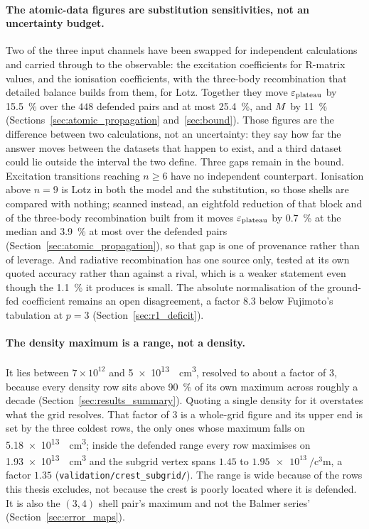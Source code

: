 \paragraph{The atomic-data figures are substitution sensitivities, not an
uncertainty budget.} Two of the three input
channels have been swapped for independent calculations and carried through to
the observable: the excitation coefficients for R-matrix values, and the
ionisation coefficients, with the three-body recombination that detailed
balance builds from them, for Lotz. Together they move $\varepsilon_{\mathrm{plateau}}$
by \SI{15.5}{\percent} over the $448$ defended pairs and at most
\SI{25.4}{\percent}, and $M$ by \SI{11}{\percent}
(Sections~\ref{sec:atomic_propagation} and~\ref{sec:bound}). Those figures are
the difference between two calculations, not an uncertainty: they say how far
the answer moves between the datasets that happen to exist, and a third dataset
could lie outside the interval the two define. Three gaps remain in the bound.
Excitation transitions reaching $n\ge6$ have no independent counterpart.
Ionisation above $n=9$ is Lotz in both the model and the substitution, so those
shells are compared with nothing; scanned instead, an eightfold reduction of
that block and of the three-body recombination built from it moves $\varepsilon_{\mathrm{plateau}}$
by \SI{0.7}{\percent} at the median and \SI{3.9}{\percent} at most over the
defended pairs (Section~\ref{sec:atomic_propagation}), so that gap is one of
provenance rather than of leverage. And radiative recombination has one source
only, tested at its own quoted accuracy rather than against a rival, which is a
weaker statement even though the \SI{1.1}{\percent} it produces is small.
The absolute normalisation of the ground-fed coefficient remains an open
disagreement, a factor $8.3$ below Fujimoto's tabulation at $p=3$
(Section~\ref{sec:r1_deficit}).

\paragraph{The density maximum is a range, not a density.} It lies between
$7\times10^{12}$ and \SI{5e13}{\per\cubic\centi\metre}, resolved to about a
factor of $3$, because every density row sits above \SI{90}{\percent} of its own
maximum across roughly a decade (Section~\ref{sec:results_summary}). Quoting a single density for it overstates what
the grid resolves. That factor of $3$ is a whole-grid figure and its upper end
is set by the three coldest rows, the only ones whose maximum falls on
\SI{5.18e13}{\per\cubic\centi\metre}; inside the defended range every row
maximises on \SI{1.93e13}{\per\cubic\centi\metre} and the subgrid vertex spans
$1.45$ to $\SI{1.95e13}{\per\cubic\centi\metre}$, a factor $1.35$
(\texttt{validation/crest\_subgrid/}). The range is wide because of the rows
this thesis excludes, not because the crest is poorly located where it is
defended. It is also the $(3,4)$ shell pair's maximum and not the
Balmer series' (Section~\ref{sec:error_maps}).

